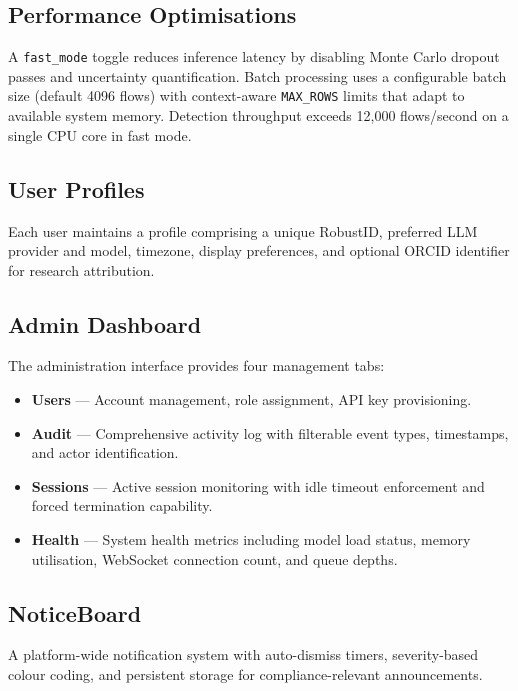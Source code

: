 \documentclass[11pt,a4paper]{article}
\begin{document}
\subsection{Performance Optimisations}
A \texttt{fast\_mode} toggle reduces inference latency by disabling Monte
Carlo dropout passes and uncertainty quantification.  Batch processing uses
a configurable batch size (default 4096 flows) with context-aware
\texttt{MAX\_ROWS} limits that adapt to available system memory.  Detection
throughput exceeds 12,000 flows/second on a single CPU core in fast mode.

\subsection{User Profiles}
Each user maintains a profile comprising a unique RobustID, preferred LLM
provider and model, timezone, display preferences, and optional ORCID
identifier for research attribution.

\subsection{Admin Dashboard}
The administration interface provides four management tabs:
\begin{itemize}
  \item \textbf{Users} --- Account management, role assignment, API key
        provisioning.
  \item \textbf{Audit} --- Comprehensive activity log with filterable
        event types, timestamps, and actor identification.
  \item \textbf{Sessions} --- Active session monitoring with idle timeout
        enforcement and forced termination capability.
  \item \textbf{Health} --- System health metrics including model load
        status, memory utilisation, WebSocket connection count, and
        queue depths.
\end{itemize}

\subsection{NoticeBoard}
A platform-wide notification system with auto-dismiss timers, severity-based
colour coding, and persistent storage for compliance-relevant announcements.

\end{document}
